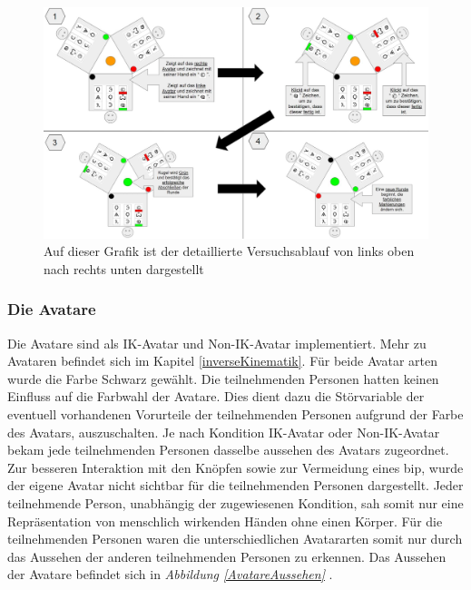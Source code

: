 \documentclass[a4paper,11pt]{article}%
\renewcommand{\\}{\vspace*{0.5\baselineskip} \newline}
\begin{document}
	\begin{figure}[h]
		\begin{footnotesize}
		\centering
			\includegraphics[scale=0.30]{Abbildungen/DetaillierterVersuchsablauf.JPG}
			
			\caption[Abbildung 1]{Auf dieser Grafik ist der detaillierte Versuchsablauf von links oben nach rechts unten dargestellt}
			\label{DetaillierterVersuchsablauf}
		\end{footnotesize}
	\end{figure}

	\subsubsection{Die Avatare}
\label{IKNIK}
Die Avatare sind als \dq{}IK-Avatar\dq{} und \dq{}Non-IK-Avatar\dq{} implementiert. Mehr zu Avataren befindet sich im Kapitel \ref{inverseKinematik}.
Für beide Avatar arten wurde die Farbe Schwarz gewählt. Die teilnehmenden Personen hatten keinen Einfluss auf die Farbwahl der Avatare. Dies dient dazu die Störvariable der eventuell vorhandenen Vorurteile der teilnehmenden Personen aufgrund der Farbe des Avatars, auszuschalten. Je nach Kondition \dq{}IK-Avatar\dq{} oder \dq{}Non-IK-Avatar\dq{} bekam jede teilnehmenden Personen dasselbe aussehen des Avatars zugeordnet. Zur besseren Interaktion mit den Knöpfen sowie zur Vermeidung eines \ac{bip}, wurde der eigene Avatar nicht sichtbar für die teilnehmenden Personen dargestellt. Jeder teilnehmende Person, unabhängig der zugewiesenen Kondition,  sah somit nur eine Repräsentation von menschlich wirkenden Händen ohne einen Körper. Für die teilnehmenden Personen waren die unterschiedlichen Avatararten somit nur durch das Aussehen der \dq{}anderen\dq{} teilnehmenden Personen zu erkennen. Das Aussehen der Avatare befindet sich in \textit{Abbildung \ref{AvatareAussehen} }.
\end{document}
